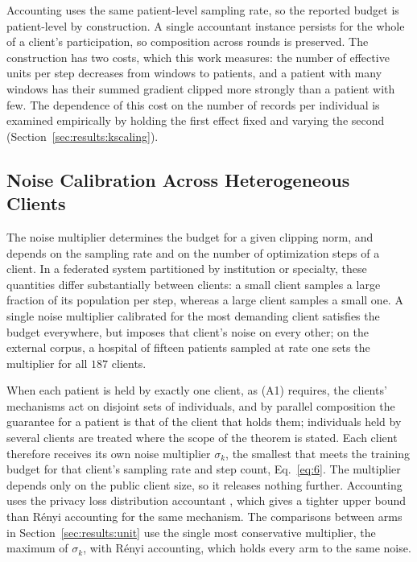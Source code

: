 Accounting uses the same patient-level sampling rate, so the reported budget is
patient-level by construction. A single accountant instance persists for the
whole of a client's participation, so composition across rounds is preserved.
The construction has two costs, which this work measures: the number of
effective units per step decreases from windows to patients, and a patient with
many windows has their summed gradient clipped more strongly than a patient with
few. The dependence of this cost on the number of records per individual is
examined empirically by holding the first effect fixed and varying the second
(Section~\ref{sec:results:kscaling}).

\subsection{Noise Calibration Across Heterogeneous Clients}
\label{sec:method:calib}

The noise multiplier determines the budget for a given clipping norm, and
depends on the sampling rate and on the number of optimization steps of a
client. In a federated system partitioned by institution or specialty, these
quantities differ substantially between clients: a small client samples a
large fraction of its population per step, whereas a large client samples a
small one. A single noise multiplier calibrated for the most demanding client
satisfies the budget everywhere, but imposes that client's noise on every
other; on the external corpus, a hospital of fifteen patients sampled at rate
one sets the multiplier for all $187$ clients.

When each patient is held by exactly one client, as (A1) requires, the clients'
mechanisms act on disjoint sets of individuals, and by parallel composition the
guarantee for a patient is that of the client that holds them; individuals held
by several clients are treated where the scope of the theorem is stated. Each client therefore receives
its own noise multiplier $\sigma_k$, the smallest that meets the training
budget for that client's sampling rate and step count, Eq.~\eqref{eq:6}. The
multiplier depends only on the public client size, so it releases nothing
further. Accounting uses the privacy loss distribution accountant \cite{ref33},
which gives a tighter upper bound than R\'enyi accounting for the same
mechanism. The comparisons between arms in Section~\ref{sec:results:unit} use
the single most conservative multiplier, the maximum of $\sigma_k$, with
R\'enyi accounting, which holds every arm to the same noise.

